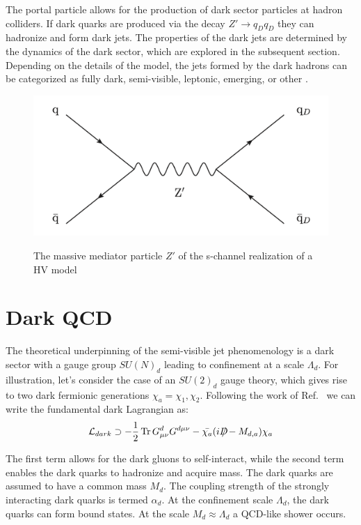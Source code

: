 The portal particle allows for the production of dark sector particles at hadron colliders. If dark quarks are produced via the decay $Z' \rightarrow q_D q_D$ they can hadronize and form dark jets. The properties of the dark jets are determined by the dynamics of the dark sector, which are explored in the subsequent section. Depending on the details of the model, the jets formed by the dark hadrons can be categorized as fully dark, semi-visible, leptonic, emerging, or other \cite{snowmass}. \par

\begin{figure}[h]
        \centering
	\includegraphics[width=.5\textwidth]{figures/ch2/zprime_feynman_diagram.png}
        \label{fig:ch2/zprime_feynman_diagram.png}
        \caption{The massive mediator particle $Z'$ of the s-channel realization of a HV model}
\end{figure}

\section{Dark QCD}
\label{sec:darkqcd}
The theoretical underpinning of the semi-visible jet phenomenology is a dark sector with a gauge group $SU(N)_d$ leading to confinement at a scale $\Lambda_d$. For illustration, let's consider the case of an $SU(2)_d$ gauge theory, which gives rise to two dark fermionic generations $\chi_a = \chi_1, \chi_2$. Following the work of Ref.~\cite{darkqcd} we can write the fundamental dark Lagrangian as:
\begin{equation}
	\mathcal{L}_{dark} \supset - \frac{1}{2} \Tr G^{d}_{\mu\nu} G^{d\mu\nu} - \bar{\chi_a} (i {D\mkern-11.5mu/}-M_{d,a}) \chi_a
\end{equation}

The first term allows for the dark gluons to self-interact, while the second term enables the dark quarks to hadronize and acquire mass. The dark quarks are assumed to have a common mass $M_d$. The coupling strength of the strongly interacting dark quarks is termed $\alpha_d$. At the confinement scale $\Lambda_d$, the dark quarks can form bound states. At the scale $M_d \approx \Lambda_d$ a QCD-like shower occurs. \par 


